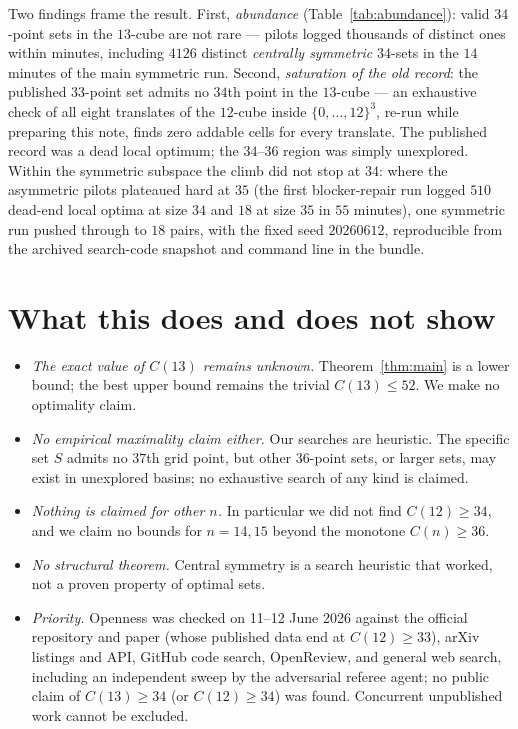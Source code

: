 \documentclass[10pt]{article}
\theoremstyle{remark}
\begin{document}
Two findings frame the result. First, \emph{abundance}
(Table~\ref{tab:abundance}): valid $34$-point sets in the $13$-cube are not
rare --- pilots logged thousands of distinct ones within minutes, including
$4126$ distinct \emph{centrally symmetric} $34$-sets in the $14$ minutes of
the main symmetric run. Second, \emph{saturation of the old record}: the
published $33$-point set admits no $34$th point in the $13$-cube --- an
exhaustive check of all eight translates of the $12$-cube inside
$\{0,\dots,12\}^3$, re-run while preparing this note, finds zero addable
cells for every translate. The published record was a dead local optimum;
the $34$--$36$ region was simply unexplored. Within the symmetric subspace
the climb did not stop at $34$: where the asymmetric pilots plateaued hard
at $35$ (the first blocker-repair run logged $510$ dead-end local optima at
size $34$ and $18$ at size $35$ in $55$ minutes), one symmetric run pushed
through to $18$ pairs, with the fixed seed $20260612$, reproducible from
the archived search-code snapshot and command line in the bundle.

\section{What this does and does not show}\label{sec:scope}

\begin{itemize}\itemsep0pt\parskip0pt
\item \emph{The exact value of $C(13)$ remains unknown.} Theorem~\ref{thm:main}
is a lower bound; the best upper bound remains the trivial $C(13) \le 52$.
We make no optimality claim.
\item \emph{No empirical maximality claim either.} Our searches are
heuristic. The specific set $S$ admits no $37$th grid point, but other
$36$-point sets, or larger sets, may exist in unexplored basins; no
exhaustive search of any kind is claimed.
\item \emph{Nothing is claimed for other $n$.} In particular we did not find
$C(12) \ge 34$, and we claim no bounds for $n = 14, 15$ beyond the monotone
$C(n) \ge 36$.
\item \emph{No structural theorem.} Central symmetry is a search heuristic
that worked, not a proven property of optimal sets.
\item \emph{Priority.} Openness was checked on 11--12 June 2026 against the
official repository and paper \cite{Repo,AlphaEvolveMath} (whose published
data end at $C(12) \ge 33$), arXiv listings and API, GitHub code search,
OpenReview, and general web search, including an independent sweep by the
adversarial referee agent; no public claim of $C(13) \ge 34$ (or
$C(12) \ge 34$) was found. Concurrent unpublished work cannot be excluded.
\end{itemize}
\end{document}
